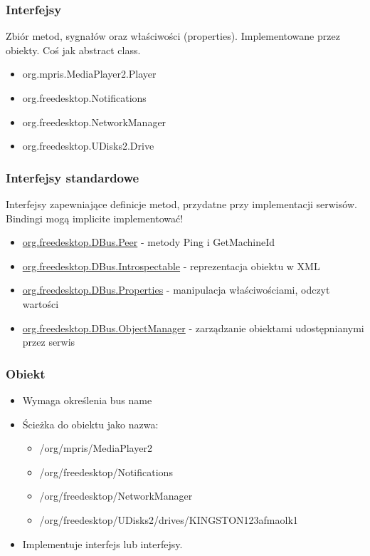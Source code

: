 \begin{frame}
    \frametitle{Interfejsy}
    Zbiór metod, sygnałów oraz właściwości (properties).
    Implementowane przez obiekty. 
    Coś jak abstract class.
    \begin{itemize}
        \item org.mpris.MediaPlayer2.Player
        \item org.freedesktop.Notifications
        \item org.freedesktop.NetworkManager
        \item org.freedesktop.UDisks2.Drive
    \end{itemize}
\end{frame}

\begin{frame}
    \frametitle{Interfejsy standardowe}
    Interfejsy zapewniające definicje metod, 
    przydatne przy implementacji serwisów.
    Bindingi mogą implicite implementować!
    \begin{itemize}
        \item \href{https://dbus.freedesktop.org/doc/dbus-java/api/org/freedesktop/DBus.Peer.html}{org.freedesktop.DBus.Peer} - metody Ping i GetMachineId \pause
        \item \href{https://dbus.freedesktop.org/doc/dbus-java/api/org/freedesktop/DBus.Introspectable.html}{org.freedesktop.DBus.Introspectable} - reprezentacja obiektu w XML \pause
        \item \href{https://dbus.freedesktop.org/doc/dbus-java/api/org/freedesktop/DBus.Properties.html}{org.freedesktop.DBus.Properties} - manipulacja właściwościami, odczyt wartości \pause
        \item \href{URL}{org.freedesktop.DBus.ObjectManager} - zarządzanie obiektami udostępnianymi przez serwis
    \end{itemize}
\end{frame}

\begin{frame}
    \frametitle{Obiekt}
    \begin{itemize}
        \item Wymaga określenia bus name 
        \item Ścieżka do obiektu jako nazwa:
        \begin{itemize}
            \item /org/mpris/MediaPlayer2 
            \item /org/freedesktop/Notifications
            \item /org/freedesktop/NetworkManager
            \item /org/freedesktop/UDisks2/drives/KINGSTON123afmaolk1
        \end{itemize}
        \item Implementuje interfejs lub interfejsy.
    \end{itemize}
\end{frame}

